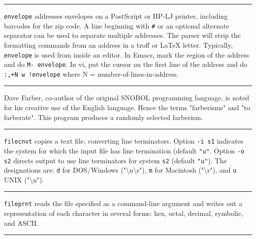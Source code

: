 {{{{{\vspace{0.25cm}\hrule{}

\texttt{envelope} addresses envelopes on a PostScript
or HP-LJ printer, including barcodes for the zip code. A line beginning
with \texttt{\#} or an optional alternate separator can be used to
separate multiple addresses. The parser will strip the formatting
commands from an address in a troff or LaTeX letter. Typically,
\texttt{envelope} is used from inside an editor. In
Emacs, mark the region of the address and do \texttt{M-{\textbar}
envelope}. In vi, put the cursor on the first line of the address and
do \texttt{:,+N w !envelope} where N = number-of-lines-in-address.

\vspace{0.25cm}\hrule{}

Dave Farber, co-author of the original SNOBOL
programming language, is noted for his creative use of the English
language. Hence the terms "farberisms" and
"to farberate". This program produces a randomly selected farberism.

\vspace{0.25cm}\hrule{}

\texttt{filecnvt} copies a text file, converting line terminators.
Option \texttt{{}-i s1} indicates the system for
which the input file has line termination (default \texttt{"u"}. Option
\texttt{{}-o s2} directs output to use line terminators for
system \texttt{s2} (default \texttt{"u"}).
The designations are: {\tt d} for DOS/Windows
("{\textbackslash}n{\textbackslash}r"), {\tt m} for Macintosh
("{\textbackslash}r"), and {\tt u} UNIX ("{\textbackslash}n").

\vspace{0.25cm}\hrule{}

\texttt{fileprnt} reads the file specified as a command-line argument
and writes out a representation of each character in several forms:
hex, octal, decimal, symbolic, and ASCII.

\vspace{0.25cm}\hrule{}

}}}}}
